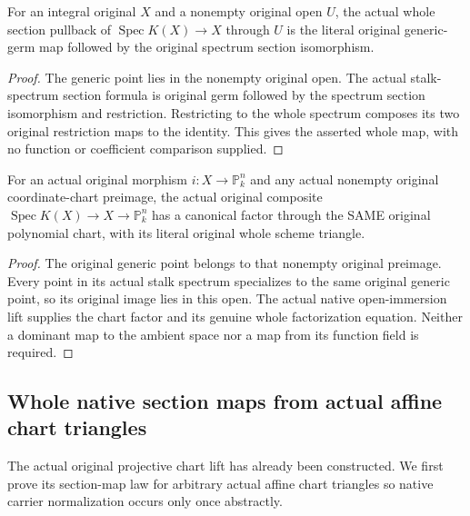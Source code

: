 \begin{lemma}
\label{lem:seven-original-generic-point-whole-germ-route}
\leanok
{}
For an integral original $X$ and a nonempty original open $U$, the
actual whole section pullback of $\operatorname{Spec}K(X)\to X$
through $U$ is the literal original generic-germ map followed by the
original spectrum section isomorphism.
\end{lemma}
\begin{proof}
The generic point lies in the nonempty original open. The actual
stalk-spectrum section formula is original germ followed by the
spectrum section isomorphism and restriction. Restricting to the
whole spectrum composes its two original restriction maps to the
identity. This gives the asserted whole map, with no function or
coefficient comparison supplied.
\end{proof}

\begin{definition}
\label{def:seven-original-projective-generic-chart-factor-route}
\leanok
{}
For an actual original morphism $i:X\to\mathbb P^n_k$ and any actual
nonempty original coordinate-chart preimage, the actual original
composite $\operatorname{Spec}K(X)\to X\to\mathbb P^n_k$ has a
canonical factor through the SAME original polynomial chart, with
its literal original whole scheme triangle.
\end{definition}
\begin{proof}
The original generic point belongs to that nonempty original preimage.
Every point in its actual stalk spectrum specializes to the same
original generic point, so its original image lies in this open.
The actual native open-immersion lift supplies the chart factor and
its genuine whole factorization equation. Neither a dominant map to
the ambient space nor a map from its function field is required.
\end{proof}

\subsection{Whole native section maps from actual affine chart triangles}
The actual original projective chart lift has already been constructed.
We first prove its section-map law for arbitrary actual affine chart
triangles so native carrier normalization occurs only once abstractly.

